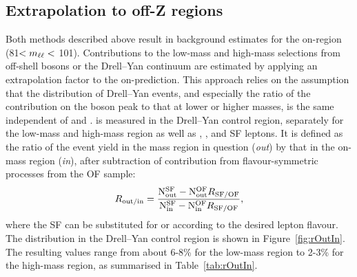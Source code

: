 \subsection{Extrapolation to off-Z regions}
\label{sec:ROutIn}
Both methods described above result in background estimates for the on-\Z region (81\GeV $< m_{\ell\ell} < $ 101\GeV). Contributions to the low-mass and high-mass selections from off-shell \Z bosons or the Drell--Yan continuum are estimated by applying an extrapolation factor \Routin to the on-\Z prediction. This approach relies on the assumption that the \mll distribution of Drell--Yan events, and especially the ratio of the contribution on the \Z boson peak to that at lower or higher masses, is the same independent of \MET and \njets. \Routin is measured in the Drell--Yan control region, separately for the low-mass and high-mass region as well as \EE, \MM, and SF leptons. It is defined as the ratio of the event yield in the mass region in question (\textit{out}) by that in the on-\Z mass region (\textit{in}), after subtraction of contribution from flavour-symmetric processes from the OF sample:
\begin{equation}
R_\text{out/in} = \frac{\mathrm{N}_{\mathrm{out}}^{\mathrm{SF}} - \mathrm{N}_{\mathrm{out}}^{\mathrm{OF}}R_{\text{SF/OF}}}{ \mathrm{N}_{\mathrm{in}}^{\mathrm{SF}} - \mathrm{N}_{\mathrm{in}}^{\mathrm{OF}}R_{\text{SF/OF}}},
\end{equation} 
where the SF can be substituted for \EE or \MM according to the desired lepton flavour. The \mll distribution in the Drell--Yan control region is shown in Figure~\ref{fig:rOutIn}. The resulting values range from about 6-8\% for the low-mass region to 2-3\% for the high-mass region, as summarised in Table~\ref{tab:rOutIn}.

